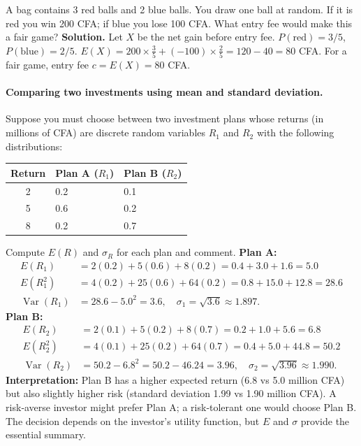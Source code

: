 \documentclass[11pt]{article}
\begin{document}
\begin{exoresolu}
A bag contains 3 red balls and 2 blue balls. You draw one ball at random. If it is red you win 200 CFA; if blue you lose 100 CFA. What entry fee would make this a fair game?
\tcblower
\textbf{Solution.}
Let $X$ be the net gain before entry fee. $P(\text{red})=3/5$, $P(\text{blue})=2/5$.
$E(X) = 200\times\frac35 + (-100)\times\frac25 = 120 - 40 = 80$ CFA.
For a fair game, entry fee $c = E(X) = 80$ CFA.

\end{exoresolu}

\paragraph{Comparing two investments using mean and standard deviation.}
Suppose you must choose between two investment plans whose returns (in millions of CFA) are discrete random variables $R_1$ and $R_2$ with the following distributions:

\begin{center}
\begin{tabularx}{\linewidth}{|c|X|X|}\hline
\textbf{Return} & \textbf{Plan A ($R_1$)} & \textbf{Plan B ($R_2$)} \\ \hline
2 & 0.2 & 0.1 \\
5 & 0.6 & 0.2 \\
8 & 0.2 & 0.7 \\ \hline
\end{tabularx}
\end{center}

\begin{exoresolu}
Compute $E(R)$ and $\sigma_R$ for each plan and comment.
\tcblower
\textbf{Plan A:}
\begin{align*}
E(R_1) &= 2(0.2) + 5(0.6) + 8(0.2) = 0.4 + 3.0 + 1.6 = 5.0 \\
E(R_1^2) &= 4(0.2) + 25(0.6) + 64(0.2) = 0.8 + 15.0 + 12.8 = 28.6 \\
\operatorname{Var}(R_1) &= 28.6 - 5.0^2 = 3.6,\quad \sigma_1 = \sqrt{3.6} \approx 1.897.
\end{align*}
\textbf{Plan B:}
\begin{align*}
E(R_2) &= 2(0.1) + 5(0.2) + 8(0.7) = 0.2 + 1.0 + 5.6 = 6.8 \\
E(R_2^2) &= 4(0.1) + 25(0.2) + 64(0.7) = 0.4 + 5.0 + 44.8 = 50.2 \\
\operatorname{Var}(R_2) &= 50.2 - 6.8^2 = 50.2 - 46.24 = 3.96,\quad \sigma_2 = \sqrt{3.96} \approx 1.990.
\end{align*}
\textbf{Interpretation:} Plan B has a higher expected return (6.8 vs 5.0 million CFA) but also slightly higher risk (standard deviation 1.99 vs 1.90 million CFA). A risk‑averse investor might prefer Plan A; a risk‑tolerant one would choose Plan B. The decision depends on the investor's utility function, but $E$ and $\sigma$ provide the essential summary.

\end{exoresolu}
\end{document}
